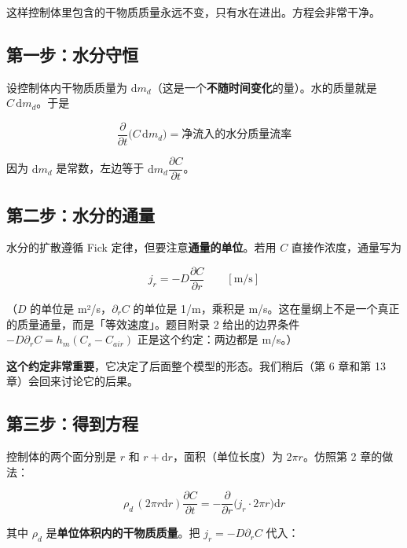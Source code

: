 这样控制体里包含的干物质质量永远不变，只有水在进出。方程会非常干净。


\subsection{第一步：水分守恒}


设控制体内干物质质量为 $\mathrm{d} m_d$（这是一个\textbf{不随时间变化}的量）。水的质量就是 $C\,\mathrm{d} m_d$。于是


\begin{equation*}
\frac{\partial}{\partial t}\big(C\,\mathrm{d} m_d\big)=\text{净流入的水分质量流率}
\end{equation*}


因为 $\mathrm{d} m_d$ 是常数，左边等于 $\mathrm{d} m_d\dfrac{\partial C}{\partial t}$。


\subsection{第二步：水分的通量}


水分的扩散遵循 Fick 定律，但要注意\textbf{通量的单位}。若用 $C$ 直接作浓度，通量写为


\begin{equation*}
j_r=-D\frac{\partial C}{\partial r}\qquad[\mathrm{m/s}]
\end{equation*}


（$D$ 的单位是 m²/s，$\partial_rC$ 的单位是 1/m，乘积是 m/s。这在量纲上不是一个真正的质量通量，而是「等效速度」。题目附录 2 给出的边界条件 $-D\partial_rC=h_m(C_s-C_{air})$ 正是这个约定：两边都是 m/s。）


\textbf{这个约定非常重要}，它决定了后面整个模型的形态。我们稍后（第 6 章和第 13 章）会回来讨论它的后果。


\subsection{第三步：得到方程}


控制体的两个面分别是 $r$ 和 $r+\mathrm{d} r$，面积（单位长度）为 $2\pi r$。仿照第 2 章的做法：


\begin{equation*}
\rho_d\,(2\pi r\mathrm{d} r)\frac{\partial C}{\partial t}=-\frac{\partial}{\partial r}\big(j_r\cdot2\pi r\big)\mathrm{d} r
\end{equation*}


其中 $\rho_d$ 是\textbf{单位体积内的干物质质量}。把 $j_r=-D\partial_rC$ 代入：


